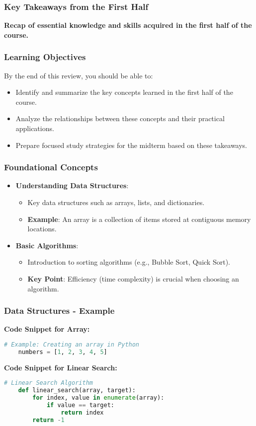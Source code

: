\documentclass[aspectratio=169]{beamer}
\begin{document}
\begin{frame}
    \frametitle{Key Takeaways from the First Half}
    \textbf{Recap of essential knowledge and skills acquired in the first half of the course.}
\end{frame}

\begin{frame}
    \frametitle{Learning Objectives}
    By the end of this review, you should be able to:
    \begin{itemize}
        \item Identify and summarize the key concepts learned in the first half of the course.
        \item Analyze the relationships between these concepts and their practical applications.
        \item Prepare focused study strategies for the midterm based on these takeaways.
    \end{itemize}
\end{frame}

\begin{frame}[fragile]
    \frametitle{Foundational Concepts}
    \begin{itemize}
        \item \textbf{Understanding Data Structures}: 
        \begin{itemize}
            \item Key data structures such as arrays, lists, and dictionaries.
            \item \textbf{Example}: An array is a collection of items stored at contiguous memory locations.
        \end{itemize}
        \item \textbf{Basic Algorithms}: 
        \begin{itemize}
            \item Introduction to sorting algorithms (e.g., Bubble Sort, Quick Sort).
            \item \textbf{Key Point}: Efficiency (time complexity) is crucial when choosing an algorithm.
        \end{itemize}
    \end{itemize}
\end{frame}

\begin{frame}[fragile]
    \frametitle{Data Structures - Example}
    \textbf{Code Snippet for Array:}
    \begin{lstlisting}[language=Python]
    # Example: Creating an array in Python
    numbers = [1, 2, 3, 4, 5]
    \end{lstlisting}
    
    \textbf{Code Snippet for Linear Search:}
    \begin{lstlisting}[language=Python]
    # Linear Search Algorithm
    def linear_search(array, target):
        for index, value in enumerate(array):
            if value == target:
                return index
        return -1
    \end{lstlisting}
\end{frame}
\end{document}
